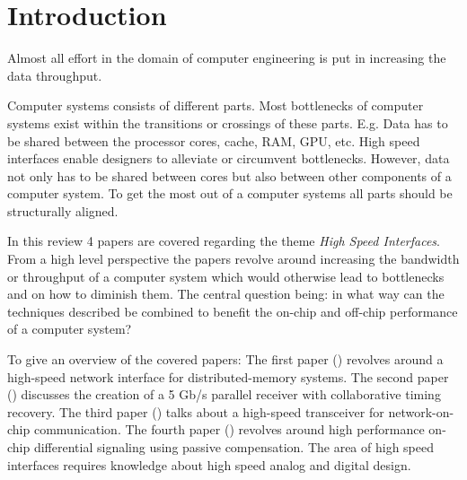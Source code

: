 \section{Introduction} \label{sec:introduction} 

Almost all effort in the domain of computer engineering is put in increasing the data throughput. 

Computer systems consists of different parts. 
Most bottlenecks of computer systems exist within the transitions or crossings of these parts.
E.g. Data has to be shared between the processor cores, cache, RAM, GPU, etc.
High speed interfaces enable designers to alleviate or circumvent bottlenecks.
However, data not only has to be shared between cores but also between other components of a computer system.
To get the most out of a computer systems all parts should be structurally aligned.

In this review 4 papers are covered regarding the theme \textit{High Speed Interfaces}. 
From a high level perspective the papers revolve around increasing the bandwidth or throughput of a computer system which would otherwise lead to bottlenecks and on how to diminish them.
The central question being: in what way can the techniques described be combined to benefit the on-chip and off-chip performance of a computer system?

To give an overview of the covered papers:
The first paper (\cite{steenkiste1997high}) revolves around a high-speed network interface for distributed-memory systems.
The second paper (\cite{agrawal20098}) discusses the creation of a 5 Gb/s parallel receiver with collaborative timing recovery.
The third paper (\cite{schinkel2009low}) talks about a high-speed transceiver for network-on-chip communication.
The fourth paper (\cite{zhang2009high}) revolves around high performance on-chip differential signaling using passive compensation.
The area of high speed interfaces requires knowledge about high speed analog and digital design.







